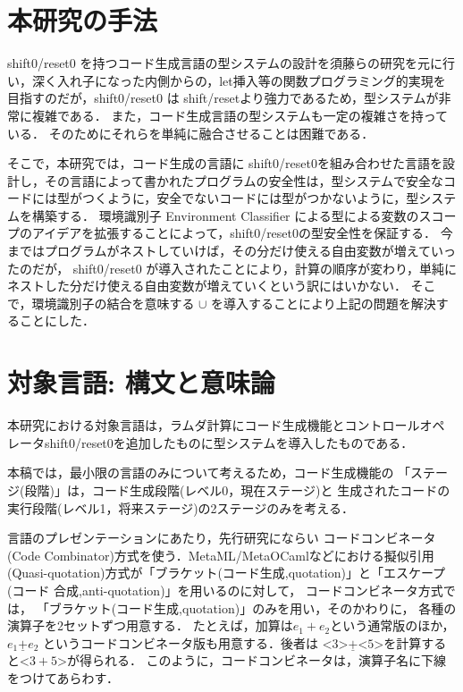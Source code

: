 \documentclass[T]{compsoft}
\newcommand\cPlus{\underline{\textbf{+}}}
\newcommand\code[1]{\texttt{<}{#1}\texttt{>}}
\theoremstyle{break}
\begin{document}
\section{本研究の手法}
shift0/reset0 を持つコード生成言語の型システムの設計を須藤らの研究\cite{Sudo2014}を元に行い，深く入れ子になった内側からの，let挿入等の関数プログラミング的実現を目指すのだが，shift0/reset0 は shift/resetより強力であるため，型システムが非常に複雑である．
また，コード生成言語の型システムも一定の複雑さを持っている．
そのためにそれらを単純に融合させることは困難である．

そこで，本研究では，コード生成の言語に shift0/reset0を組み合わせた言語を設計し，その言語によって書かれたプログラムの安全性は，型システムで安全なコードには型がつくように，安全でないコードには型がつかないように，型システムを構築する．
環境識別子 Environment Classifier による型による変数のスコープのアイデア\cite{Taha:2003:EC:604131.604134,Sudo2014}を拡張することによって，shift0/reset0の型安全性を保証する．
今まではプログラムがネストしていけば，その分だけ使える自由変数が増えていったのだが， shift0/reset0 が導入されたことにより，計算の順序が変わり，単純にネストした分だけ使える自由変数が増えていくという訳にはいかない．
そこで，環境識別子の結合を意味する $\cup$ を導入することにより上記の問題を解決することにした．




\section{対象言語: 構文と意味論}

本研究における対象言語は，ラムダ計算にコード生成機能とコントロールオペ
レータshift0/reset0を追加したものに型システムを導入したものである．

本稿では，最小限の言語のみについて考えるため，コード生成機能の
「ステージ(段階)」は，コード生成段階(レベル0，現在ステージ)と
生成されたコードの実行段階(レベル1，将来ステージ)の2ステージのみを考える．

言語のプレゼンテーションにあたり，先行研究にならい
コードコンビネータ(Code Combinator)方式を使う．MetaML/MetaOCamlなどにおける擬似引用
(Quasi-quotation)方式が「ブラケット(コード生成,quotation)」と「エスケープ(コード
合成,anti-quotation)」を用いるのに対して，
コードコンビネータ方式では，
「ブラケット(コード生成,quotation)」のみを用い，そのかわりに，
各種の演算子を2セットずつ用意する．
たとえば，加算は$e_1+e_2$という通常版のほか，
$e_1 \cPlus e_2$ というコードコンビネータ版も用意する．後者は
$\code{3} \cPlus \code{5}$を計算すると$\code{3+5}$が得られる．
このように，コードコンビネータは，演算子名に下線をつけてあらわす．
\end{document}
